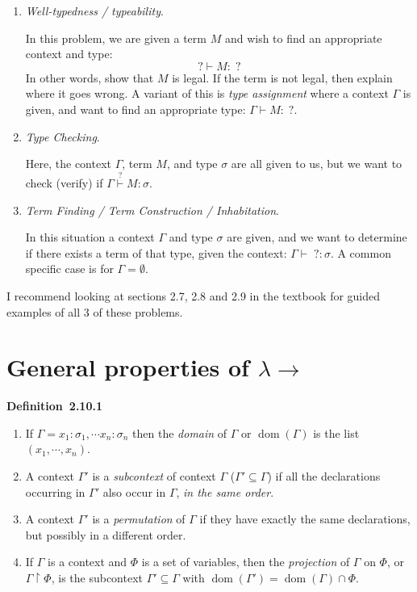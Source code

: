 \documentclass[letterpaper]{article}
\newenvironment{definition}[2][]{\par\medskip
	\noindent \textbf{Definition~#2}~~~#1 \rmfamily}{\medskip}
\newcommand{\larr}{\lambda \!\! \rightarrow}
\DeclareMathOperator{\dom}{dom}
\newcommand{\proj}{\upharpoonright}
\begin{document}
\begin{enumerate}
	\item \emph{Well-typedness / typeability}.
	
	In this problem, we are given a term $M$ and wish to find an appropriate context and type:
	\[
		? \vdash M : \; ?
	\]
	In other words, show that $M$ is legal. If the term is not legal, then explain where it goes wrong. A variant of this is \emph{type assignment} where a context $\Gamma$ is given, and want to find an appropriate type: $\Gamma \vdash M : \; ?$.

	\item \emph{Type Checking}.
	
	Here, the context $\Gamma$, term $M$, and type $\sigma$ are all given to us, but we want to check (verify) if $\Gamma \overset{?}{\vdash} M : \sigma$.

	\item \emph{Term Finding / Term Construction / Inhabitation}.
	
	In this situation a context $\Gamma$ and type $\sigma$ are given, and we want to determine if there exists a term of that type, given the context: $\Gamma \vdash \; ? : \sigma$. A common specific case is for $\Gamma = \emptyset$.
\end{enumerate}
I recommend looking at sections 2.7, 2.8 and 2.9 in the textbook for guided examples of all 3 of these problems.

\section{General properties of $\larr$}

\begin{definition}{2.10.1}
	\begin{enumerate}
		\item If $\Gamma = x_1 : \sigma_1, \cdots x_n : \sigma_n$ then the \emph{domain} of $\Gamma$ or $\dom(\Gamma)$ is the list $(x_1, \cdots, x_n)$.
		\item A context $\Gamma'$ is a \emph{subcontext} of context $\Gamma$ ($\Gamma' \subseteq \Gamma$) if all the declarations occurring in $\Gamma'$ also occur in $\Gamma$, \emph{in the same order}.
		\item A context $\Gamma'$ is a \emph{permutation} of $\Gamma$ if they have exactly the same declarations, but possibly in a different order.
		\item If $\Gamma$ is a context and $\Phi$ is a set of variables, then the \emph{projection} of $\Gamma$ on $\Phi$, or $\Gamma \proj \Phi$, is the subcontext $\Gamma' \subseteq \Gamma$ with $\dom(\Gamma') = \dom(\Gamma) \cap \Phi$. 
	\end{enumerate}
\end{definition}
\end{document}

